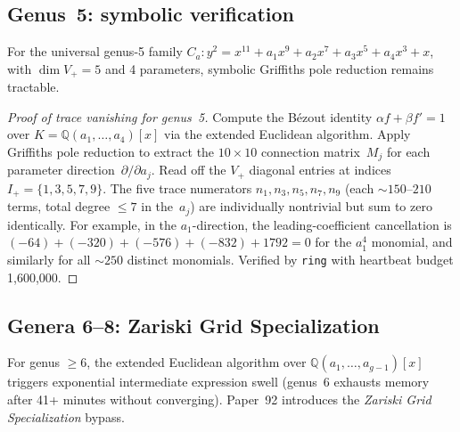 \documentclass[11pt]{article}
\theoremstyle{plain}
\theoremstyle{definition}
\theoremstyle{remark}
\newcommand{\QQ}{\mathbb{Q}}
\begin{document}
\subsection{Genus~5: symbolic verification}

For the universal genus-5 family $C_a: y^2 = x^{11} + a_1 x^9 + a_2 x^7 + a_3 x^5 + a_4 x^3 + x$, with $\dim V_+ = 5$ and 4 parameters, symbolic Griffiths pole reduction remains tractable.

\begin{proof}[Proof of trace vanishing for genus~5]
Compute the B\'ezout identity $\alpha f + \beta f' = 1$ over $K = \QQ(a_1, \ldots, a_4)[x]$ via the extended Euclidean algorithm.  Apply Griffiths pole reduction to extract the $10 \times 10$ connection matrix~$M_j$ for each parameter direction~$\partial/\partial a_j$.  Read off the $V_+$ diagonal entries at indices $I_+ = \{1, 3, 5, 7, 9\}$.  The five trace numerators $n_1, n_3, n_5, n_7, n_9$ (each ${\sim}150$--$210$ terms, total degree $\leq 7$ in the~$a_j$) are individually nontrivial but sum to zero identically.  For example, in the $a_1$-direction, the leading-coefficient cancellation is $(-64) + (-320) + (-576) + (-832) + 1792 = 0$ for the $a_1^4$ monomial, and similarly for all ${\sim}250$ distinct monomials.  Verified by \texttt{ring} with heartbeat budget 1,600,000.
\end{proof}

\subsection{Genera 6--8: Zariski Grid Specialization}

For genus $\geq 6$, the extended Euclidean algorithm over $\QQ(a_1, \ldots, a_{g-1})[x]$ triggers exponential intermediate expression swell (genus~6 exhausts memory after 41+ minutes without converging).  Paper~92 introduces the \emph{Zariski Grid Specialization} bypass.
\end{document}
